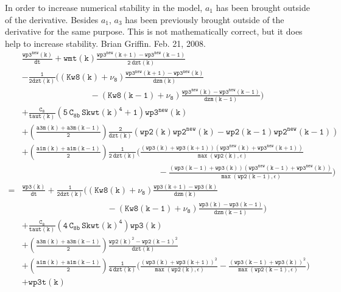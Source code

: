 \documentclass[11pt,fleqn]{article}
\begin{document}
In order to increase numerical stability in the model, $a_{1}$ has been brought
outside of the derivative.  Besides $a_{1}$, $a_{3}$ has been previously brought
outside of the derivative for the same purpose.  This is not mathematically
correct, but it does help to increase stability.  Brian Griffin.  Feb. 21, 2008.
% 
\begin{equation}
\begin{split}
& \mathtt{
  \frac{wp3^{new}(k)}{dt}
  + wmt(k) \frac{wp3^{new}(k+1)-wp3^{new}(k-1)}{2 \ dzt(k)}
  } \\
& \mathtt{
  - \frac{1}{2dzt(k)} 
    \bigg( 
            \left(Kw8(k)+\nu_8\right)
            \frac{wp3^{new}(k+1)-wp3^{new}(k)}{dzm(k)} }  \\
& \mathtt{ \qquad \qquad \qquad \qquad
          - \left(Kw8(k-1)+\nu_8\right)
            \frac{wp3^{new}(k)-wp3^{new}(k-1)}{dzm(k-1)}
    \bigg)
  } \\
& \mathtt{
+ \frac{C_8}{taut(k)}
   \left(  5 \, C_{8b} \, {Skwt(k)}^4 + 1 \right) wp3^{new}(k)
  } \\
& \mathtt{
  + \left(\frac{a3m(k)+a3m(k-1)}{2}\right) \frac{2}{dzt(k)}
    \left(wp2(k) wp2^{new}(k) - wp2(k-1) wp2^{new}(k-1) \right)
  } \\
& \mathtt{
  + \left(\frac{a1m(k)+a1m(k-1)}{2}\right) \frac{1}{2 \, dzt(k)}
    \bigg(
      \frac{ \left(wp3(k)+wp3(k+1)\right)
             \left(wp3^{new}(k)+wp3^{new}(k+1)\right) }
           { \max\left( wp2(k), \epsilon \right) }
  } \\
& \mathtt{ \qquad \qquad \qquad \qquad \qquad \qquad \qquad \qquad
     -\frac{ \left(wp3(k-1)+wp3(k)\right)
             \left(wp3^{new}(k-1)+wp3^{new}(k)\right) }
           { \max\left( wp2(k-1), \epsilon \right) }
    \bigg)
  } \\
=& \mathtt{
  \frac{wp3(k)}{dt} 
  + \frac{1}{2dzt(k)} 
    \bigg( 
            \left(Kw8(k)+\nu_8\right)
            \frac{wp3(k+1)-wp3(k)}{dzm(k)} }  \\
& \mathtt{ \qquad \qquad \qquad \qquad \qquad
          - \left(Kw8(k-1)+\nu_8\right)
            \frac{wp3(k)-wp3(k-1)}{dzm(k-1)}
    \bigg)
  } \\
& \mathtt{
+ \frac{C_8}{taut(k)}
   \left( 4 \, C_{8b} \, {Skwt(k)}^4 \right) wp3(k)
  } \\
& \mathtt{
  + \left(\frac{a3m(k)+a3m(k-1)}{2}\right) \frac{wp2(k)^2 - wp2(k-1)^2 }
                                                {dzt(k)}
  } \\
& \mathtt{
  + \left(\frac{a1m(k)+a1m(k-1)}{2}\right) \frac{1}{4 \, dzt(k)}
    \bigg(
      \frac{ \left(wp3(k)+wp3(k+1)\right)^2 }
           { \max\left( wp2(k), \epsilon \right) }
     -\frac{ \left(wp3(k-1)+wp3(k)\right)^2 }
           { \max\left( wp2(k-1), \epsilon \right) }
    \bigg)
  } \\
& \mathtt{
+ wp3t(k)
  }
\end{split}
\end{equation}
\end{document}

